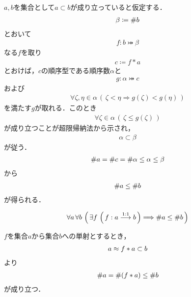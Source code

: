 	\begin{sketch}
		$a,b$を集合として$a \subset b$が成り立っていると仮定する．
		\begin{align}
			\beta \coloneqq \# b
		\end{align}
		とおいて
		\begin{align}
			f:b \bij \beta
		\end{align}
		なる$f$を取り
		\begin{align}
			c \coloneqq f \ast a
		\end{align}
		とおけば，$c$の順序型である順序数$\alpha$と
		\begin{align}
			g:\alpha \bij c
		\end{align}
		および
		\begin{align}
			\forall \zeta,\eta \in \alpha\,
			\left(\, \zeta < \eta \Longrightarrow g(\zeta) < g(\eta)\, \right)
		\end{align}
		を満たす$g$が取れる．このとき
		\begin{align}
			\forall \zeta \in \alpha\, \left(\, \zeta \leq g(\zeta)\, \right)
		\end{align}
		が成り立つことが超限帰納法から示され，
		\begin{align}
			\alpha \subset \beta
		\end{align}
		が従う．
		\begin{align}
			\# a = \# c = \# \alpha \leq \alpha \leq \beta
		\end{align}
		から
		\begin{align}
			\# a \leq \# b
		\end{align}
		が得られる．
		\QED
	\end{sketch}
	
	\begin{screen}
		\begin{thm}[単射が存在すれば濃度は小さい]
			\begin{align}
				\forall a\, \forall b\, \left(\, \exists f\, \left(\, f:a \overset{\mathrm{1:1}}{\longrightarrow}  b\, \right)
				\Longrightarrow \# a \leq \# b\, \right)
			\end{align}
		\end{thm}
	\end{screen}
	
	\begin{sketch}
		$f$を集合$a$から集合$b$への単射とするとき，
		\begin{align}
			a \approx f \ast a \subset b
		\end{align}
		より
		\begin{align}
			\# a = \# (f \ast a) \leq \# b
		\end{align}
		が成り立つ．
		\QED
	\end{sketch}
	

